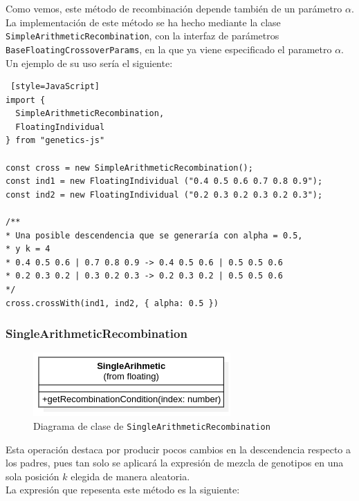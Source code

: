 Como vemos, este método de recombinación depende también de un parámetro $\alpha$. \\

La implementación de este método se ha hecho mediante la clase \texttt{SimpleArithmeticRecombination}, con la interfaz de parámetros \texttt{BaseFloatingCrossoverParams}, en la que ya viene especificado el parametro $\alpha$. \\

Un ejemplo de su uso sería el siguiente: \\

\begin{lstlisting} [style=JavaScript]
import { 
  SimpleArithmeticRecombination, 
  FloatingIndividual 
} from "genetics-js"

const cross = new SimpleArithmeticRecombination();
const ind1 = new FloatingIndividual ("0.4 0.5 0.6 0.7 0.8 0.9");
const ind2 = new FloatingIndividual ("0.2 0.3 0.2 0.3 0.2 0.3");

/**
* Una posible descendencia que se generaría con alpha = 0.5,
* y k = 4
* 0.4 0.5 0.6 | 0.7 0.8 0.9 -> 0.4 0.5 0.6 | 0.5 0.5 0.6 
* 0.2 0.3 0.2 | 0.3 0.2 0.3 -> 0.2 0.3 0.2 | 0.5 0.5 0.6
*/
cross.crossWith(ind1, ind2, { alpha: 0.5 })
\end{lstlisting}

\subsubsection{SingleArithmeticRecombination}

\begin{figure}[ht]
    \centering
    \includegraphics[scale=0.7]{mem/images/cap-4/4.2.6(Crossover)/SingleArithmetic.png}
    \caption{Diagrama de clase de \texttt{SingleArithmeticRecombination}}
    \label{fig:my_label}
\end{figure}


Esta operación destaca por producir pocos cambios en la descendencia respecto a los padres, pues tan solo se aplicará la expresión de mezcla de genotipos en una sola posición $k$ elegida de manera aleatoria. \\

La expresión que repesenta este método es la siguiente:\\

